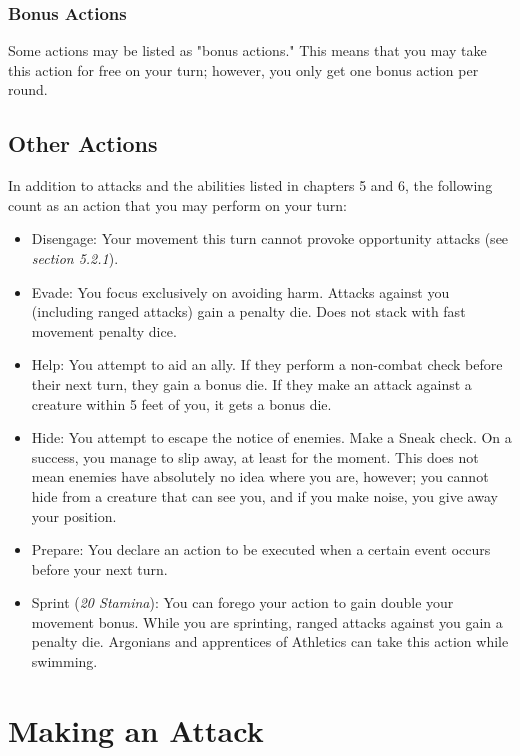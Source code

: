 \documentclass[12pt]{book}
\begin{document}
\subsubsection{Bonus Actions}
Some actions may be listed as "bonus actions." This means that you may take this action for free on your turn; however, you only get one bonus action per round.

\subsection{Other Actions}
In addition to attacks and the abilities listed in chapters 5 and 6, the following count as an action that you may perform on your turn:

\begin{itemize}
	\item Disengage: Your movement this turn cannot provoke opportunity attacks (see \textit{section 5.2.1}).
	\item Evade: You focus exclusively on avoiding harm. Attacks against you (including ranged attacks) gain a penalty die. Does not stack with fast movement penalty dice.
	\item Help: You attempt to aid an ally. If they perform a non-combat check before their next turn, they gain a bonus die. If they make an attack against a creature within 5 feet of you, it gets a bonus die.
	\item Hide: You attempt to escape the notice of enemies. Make a Sneak check. On a success, you manage to slip away, at least for the moment. This does not mean enemies have absolutely no idea where you are, however; you cannot hide from a creature that can see you, and if you make noise, you give away your position.
	\item Prepare: You declare an action to be executed when a certain event occurs before your next turn.
	\item Sprint (\textit{20 Stamina}): You can forego your action to gain double your movement bonus. While you are sprinting, ranged attacks against you gain a penalty die. Argonians and apprentices of Athletics can take this action while swimming.
\end{itemize}

\section{Making an Attack}
\end{document}
